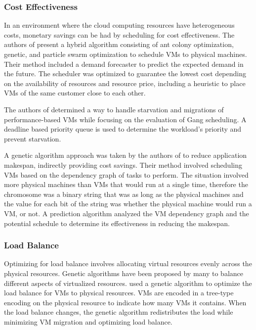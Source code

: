 \documentclass[12pt]{article}
\begin{document}
\subsubsection{Cost Effectiveness}

In an environment where the cloud computing resources have heterogeneous costs, monetary savings can be had by scheduling for cost effectiveness. The authors of \cite{mark2011evolutionary} present a hybrid algorithm consisting of ant colony optimization, genetic, and particle swarm optimization to schedule VMs to physical machines. Their method included a demand forecaster to predict the expected demand in the future. The scheduler was optimized to guarantee the lowest cost depending on the availability of resources and resource price, including  a heuristic to place VMs of the same customer close to each other.

The authors of \cite{ioannis2011cost} determined a way to handle starvation and migrations of performance-based VMs while focusing on the evaluation of Gang scheduling. A deadline based priority queue is used to determine the workload's priority and prevent starvation.

A genetic algorithm approach was taken by the authors of \cite{lee2010topology} to reduce application makespan, indirectly providing cost savings. Their method involved scheduling VMs based on the dependency graph of tasks to perform. The situation involved more physical machines than VMs that would run at a single time, therefore the chromosome was a binary string that was as long as the physical machines and the value for each bit of the string was whether the physical machine would run a VM, or not. A prediction algorithm analyzed the VM dependency graph and the potential schedule to determine its effectiveness in reducing the makespan.




\subsubsection{Load Balance}

Optimizing for load balance involves allocating virtual resources evenly across the physical resources. Genetic algorithms have been proposed by many to balance different aspects of virtualized resources. \cite{hu2010scheduling} used a genetic algorithm to optimize the load balance for VMs to physical resources. VMs are encoded in a tree-type encoding on the physical resource to indicate how many VMs it contains. When the load balance changes, the genetic algorithm redistributes the load while minimizing VM migration and optimizing load balance.
\end{document}
